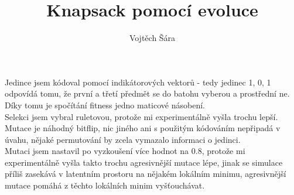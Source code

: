 \documentclass{article}
\title{Knapsack pomocí evoluce}
\author{Vojtěch Šára}
\begin{document}
\maketitle
Jedince jsem kódoval pomocí indikátorových vektorů - tedy jedinec 1, 0, 1 odpovídá tomu, že první a třetí předmět se do batohu
vyberou a prostřední ne. Díky tomu je spočítání fitness jedno maticové násobení.\\
Selekci jsem vybral ruletovou, protože mi experimentálně vyšla trochu lepší.\\
Mutace je náhodný bitflip, nic jiného ani s použitým kódováním nepřipadá v úvahu, nějaké permutování by zcela vymazalo informaci o jedinci.\\
Mutaci jsem nastavil po vyzkoušení více hodnot na 0.8, protože mi experimentálně vyšla
takto trochu agresivnější mutace lépe, jinak se simulace příliš zasekává v latentním prostoru
na nějakém lokálním minimu, agresivnější mutace pomáhá z těchto lokálních minim vyšťouchávat. 
\end{document}
